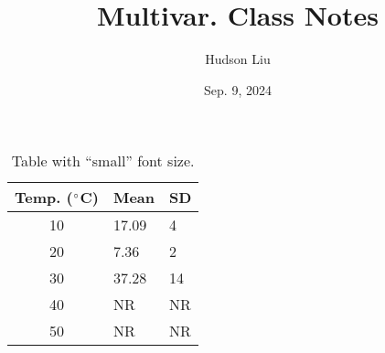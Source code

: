 \documentclass{article}
\title{Multivar. Class Notes}
\author{Hudson Liu}
\date{Sep. 9, 2024}
\begin{document}
\begin{table}[ht]
\centering
\caption{Table with ``small'' font size.}
\begin{small}
\begin{tabular}[t]{cll}
Temp. ($\degree$C)&Mean&SD\\
\hline
10&17.09&4\\
20&7.36&2\\
30&37.28&14\\
40&NR&NR\\
50&NR&NR\\
\hline
\end{tabular}
\end{small}
\end{table}
\end{document}
